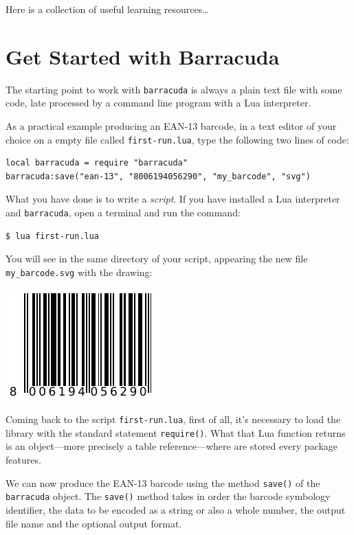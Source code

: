 \documentclass[11pt]{article}
\newcommand{\code}[1]{\texttt{#1}}
\newcommand{\brcd}{\code{barracuda}}
\begin{document}
Here is a collection of useful learning resources\dots

%
%
%
%


\section{Get Started with Barracuda}
\label{secEnter}

The starting point to work with \brcd{} is always a plain text file with some
code, late processed by a command line program with a Lua interpreter.

As a practical example producing an EAN-13 barcode, in a text editor of your
choice on a empty file called \code{first-run.lua}, type the following two lines
of code:
\medskip
\begin{Verbatim}[label=\footnotesize\code{first-run.lua}]
local barracuda = require "barracuda"
barracuda:save("ean-13", "8006194056290", "my_barcode", "svg")
\end{Verbatim}

What you have done is to write a \emph{script}. If you have installed a Lua
interpreter and \brcd{}, open a terminal and run the command:
\begin{Verbatim}
$ lua first-run.lua
\end{Verbatim}

You will see in the same directory of your script, appearing the new file
\code{my\_barcode.svg} with the drawing:
\begin{center}
\includegraphics{image/8006194056290}
\end{center}

Coming back to the script \code{first-run.lua}, first of all, it's necessary to
load the library with the standard statement \code{require()}. What that Lua
function returns is an object---more precisely a table reference---where are
stored every package features.

We can now produce the EAN-13 barcode using the method \code{save()} of the
\brcd{} object. The \code{save()} method takes in order the barcode symbology
identifier, the data to be encoded as a string or also a whole number, the
output file name and the optional output format.
\end{document}
